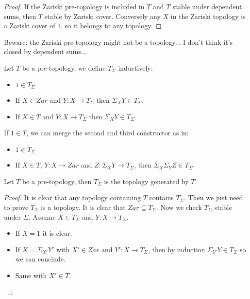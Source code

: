 \begin{proof}
If the Zariski pre-topology is included in $T$ and $T$ stable under dependent sums, then $T$ stable by Zariski cover. Conversely any $X$ in the Zariski topology is a Zariski cover of $1$, so it belongs to any topology.
\end{proof}

Beware: the Zariski pre-topology might not be a topology... I don't think it's closed by dependent sums...

\begin{definition}
Let $T$ be a pre-topology, we define $T_\Sigma$ inductively:
\begin{itemize}
\item $1\in T_\Sigma$
\item If $X\in Zar$ and $Y:X\to T_\Sigma$ then $\Sigma_XY\in T_\Sigma$.
\item If $X\in T$ and $Y:X\to T_\Sigma$ then $\Sigma_XY\in T_\Sigma$.
\end{itemize}
\end{definition}

\begin{remark}
If $1\in T$, we can merge the second and third constructor as in:
\begin{itemize}
\item $1\in T_\Sigma$
 \item If $X\in T$, $Y:X\to Zar$ and $Z:\Sigma_XY\to T_\Sigma$, then $\Sigma_X\Sigma_YZ\in T_\Sigma$.
\end{itemize}
\end{remark}

\begin{lemma}\label{description-topology}
Let $T$ be a pre-topology, then $T_\Sigma$ is the topology generated by $T$.
\end{lemma}

\begin{proof}
It is clear that any topology containing $T$ contains $T_\Sigma$. Then we just need to prove $T_\Sigma$ is a topology. It is clear that $Zar\subseteq T_\Sigma$. Now we check $T_\Sigma$ stable under $\Sigma$. Assume $X\in T_\Sigma$ and $Y:X\to T_\Sigma$.
\begin{itemize}
\item If $X=1$ it is clear.
\item If $X=\Sigma_{X'}Y'$ with $X'\in Zar$ and $Y':X\to T_\Sigma$, then by induction $\Sigma_{Y'}Y\in T_\Sigma$ so we can conclude.
\item Same with $X'\in T$.
\end{itemize}
\end{proof}

